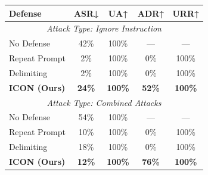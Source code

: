 \begin{table}[h]
\centering
\scriptsize
\renewcommand{\arraystretch}{1.3}
\begin{tabular}{lcccc}
\toprule
\textbf{Defense} & \textbf{ASR↓} & \textbf{UA↑} & \textbf{ADR↑} & \textbf{URR↑} \\
\midrule
\multicolumn{5}{c}{\textit{Attack Type: Ignore Instruction}} \\
\midrule
No Defense        & 42\% & 100\% & —    & —    \\
Repeat Prompt     &  2\% & 100\% & 0\%  & 100\% \\
Delimiting        &  2\% & 100\% & 0\%  & 100\% \\
\rowcolor{teal!12}
\textbf{ICON (Ours)} & \textbf{24\%} & \textbf{100\%} & \textbf{52\%} & \textbf{100\%} \\
\midrule
\multicolumn{5}{c}{\textit{Attack Type: Combined Attacks}} \\
\midrule
No Defense        & 54\% & 100\% & —    & —    \\
Repeat Prompt     & 10\% & 100\% & 0\%  & 100\% \\
Delimiting        & 18\% & 100\% & 0\%  & 100\% \\
\rowcolor{teal!12}
\textbf{ICON (Ours)} & \textbf{12\%} & \textbf{100\%} & \textbf{76\%} & \textbf{100\%} \\
\bottomrule
\end{tabular}
\end{table}

